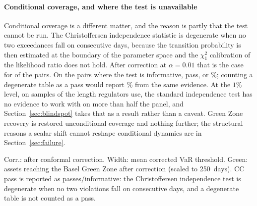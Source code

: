 \documentclass[preprint,11pt,authoryear]{elsarticle}
\newcommand{\VaR}{\mathrm{VaR}}
\newcommand{\1}{\boldsymbol{1}}
\newcommand{\qVstat}{\hat{q}_{\scriptscriptstyle\mathrm{V}}^{\,\mathrm{stat}}}
\begin{document}
\paragraph{Conditional coverage, and where the test is unavailable} Conditional
coverage is a different matter, and the reason is partly that the test cannot be
run. The Christoffersen independence statistic is degenerate when no two
exceedances fall on consecutive days, because the transition probability is then
estimated at the boundary of the parameter space and the $\chi^2_1$ calibration
of the likelihood ratio does not hold. After correction at $\alpha = 0.01$ that
is the case for \nMainCCUndefined{} of the \nMainPairs{} pairs. On the
\nMainCCDefined{} pairs where the test is informative, \nMainCCPass{} pass, or
\nMainCCPassPct\%; counting a degenerate table as a pass would report
\nMainCCAsPassPct\% from the same evidence. At the $1\%$ level, on samples of
the length regulators use, the standard independence test has no evidence to
work with on more than half the panel, and Section~\ref{sec:blindspot} takes
that as a result rather than a caveat. Green Zone recovery is restored
unconditional coverage and nothing further; the structural reasons a scalar
shift cannot reshape conditional dynamics are in Section~\ref{sec:failure}.

\begin{table}[htbp]
	\centering
	\caption{Forecast audit across 16 forecasters and 24 assets ($\alpha = 0.01$), ordered by $\bar R$. QS: Quantile Score ($\times 10^{4}$, lower is better). $\bar R = |\qVstat|/|\VaR_{\mathrm{raw}}|$, averaged over assets: the size of the conformal correction relative to the threshold it adjusts. Kind records the estimator class. The two Chronos rows without the analytic suffix are the checkpoint-default configuration of Supplement~S.14 and are retained in the table as the measured consequence of that default, not as forecasters. No threshold is applied and no classification is implied. $\bar R$ is a ratio of absolute values and is therefore non-negative by construction; the sign that carries the diagnosis belongs to $\qVstat$, and the last column counts the assets on which it is negative.}
	\label{tab:master}
	\tiny
	\setlength{\tabcolsep}{3pt}
	
	\begin{minipage}{\linewidth}\scriptsize
		\smallskip
		Corr.: after conformal correction. Width: mean corrected VaR threshold. Green: assets reaching the Basel Green Zone after correction (scaled to 250~days). CC pass is reported as passes/informative: the Christoffersen independence test is degenerate when no two violations fall on consecutive days, and a degenerate table is not counted as a pass.

		\smallskip
		
	\end{minipage}
\end{table}
\end{document}
